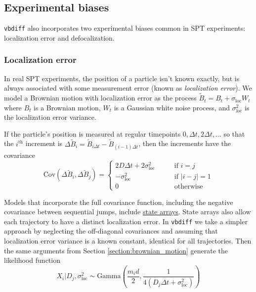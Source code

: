 \documentclass{article}
\begin{document}
\subsection{Experimental biases}

\verb|vbdiff| also incorporates two experimental biases common
in SPT experiments: localization error and defocalization.

\subsubsection{Localization error}

In real SPT experiments, the position of a particle isn't known exactly,
but is always associated with some measurement error (known as
\emph{localization error}). We model a Brownian motion with
localization error as the process $\tilde{B}_{t} = B_{t} + \sigma_{\text{loc}} W_{t}$
where $B_{t}$ is a Brownian motion, $W_{t}$ is a Gaussian white noise process,
and $\sigma_{\text{loc}}^{2}$ is the localization error variance. \newline

If the particle's position is measured at regular timepoints $0, \Delta t, 2 \Delta t, ...$
so that the $i^{\text{th}}$ increment is $\Delta \tilde{B}_{i} = \tilde{B}_{i \Delta t} - \tilde{B}_{(i-1) \Delta t}$, then the increments have the covariance
\[
    \text{Cov} \left( \Delta \tilde{B}_{i}, \Delta \tilde{B}_{j} \right) = \begin{cases}
        2 D \Delta t + 2 \sigma_{\text{loc}}^{2} \qquad &\text{if } i = j \\
        - \sigma_{\text{loc}}^{2} \qquad &\text{if } \left| i - j \right| = 1 \\
        0 \qquad &\text{otherwise}
    \end{cases}
\]

Models that incorporate the full covariance function, including the negative
covariance between sequential jumps, include \href{https://github.com/alecheckert/saspt}{state arrays}. State arrays also allow each trajectory to have a distinct
localization error. In \verb|vbdiff| we take a simpler approach by neglecting the
off-diagonal covariances and assuming that localization error variance is a known
constant, identical for all trajectories. Then the same arguments
from Section \ref{section:brownian_motion} generate the likelihood function
\begin{equation}
    X_{i} | D_{j}, \sigma_{\text{loc}}^{2} \sim \text{Gamma} \left( \frac{m_{i} d}{2}, \frac{1}{4 (D_{j} \Delta t + \sigma_{\text{loc}}^{2} )} \right)
\end{equation}
\end{document}
